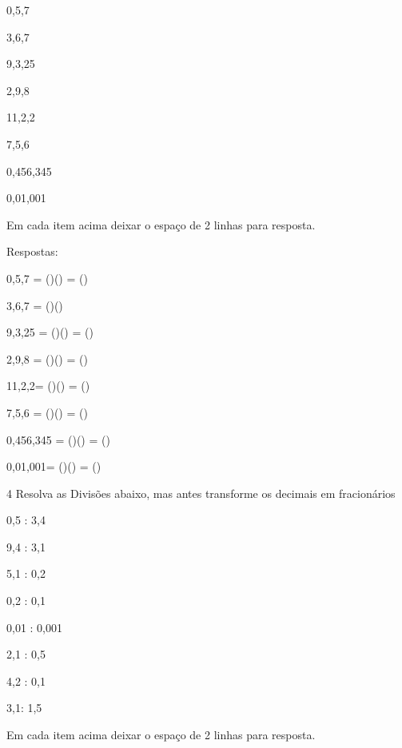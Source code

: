 \item 0,5,7
\item 3,6,7
\item 9,3,25
\item 2,9,8
\item 11,2,2
\item 7,5,6
\item 0,456,345
\item 0,01,001

Em cada item acima deixar o espaço de 2 linhas para resposta.

Respostas:

\item 0,5,7 = ()\times () = ()
\item 3,6,7 = ()\times ()
\item 9,3,25 = ()\times () = ()
\item 2,9,8 = ()\times () = ()
\item 11,2,2= ()\times () = ()
\item 7,5,6 = ()\times () = ()
\item 0,456,345 = ()\times () = ()
\item 0,01,001= ()\times () = ()

\num{4} Resolva as Divisões abaixo, mas antes transforme os decimais em
fracionários

\item 0,5 : 3,4
\item 9,4 : 3,1
\item 5,1 : 0,2
\item 0,2 : 0,1
\item 0,01 : 0,001
\item 2,1 : 0,5
\item 4,2 : 0,1
\item 3,1: 1,5

Em cada item acima deixar o espaço de 2 linhas para resposta.

